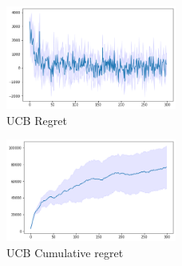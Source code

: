 \begin{multicols}{2}
    \begin{figure}[H]
        \begin{center}
        \includegraphics[width=0.5\textwidth]{img/ucb_regret5.png}
        \caption{UCB Regret}
        \label{fig:regret51}
        \end{center}
    \end{figure}
    \columnbreak
    \begin{figure}[H]
        \begin{center}
        \includegraphics[width=0.5\textwidth]{img/ucb_cum_regret5.png}
        \caption{UCB Cumulative regret}
        \label{fig:cum_reg51}
        \end{center}
    \end{figure}
\end{multicols}
